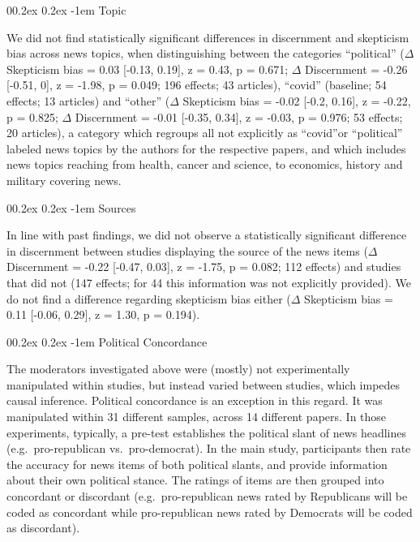 \documentclass[
  man]{apa6}
\makeatletter
\let\oldparagraph\paragraph
\renewcommand{\paragraph}{
    \@ifstar
      \xxxParagraphStar
      \xxxParagraphNoStar
  }
\newcommand{\xxxParagraphStar}[1]{\oldparagraph*{#1}\mbox{}}
\newcommand{\xxxParagraphNoStar}[1]{\oldparagraph{#1}\mbox{}}
\renewcommand{\paragraph}{\@startsection{paragraph}{4}{\parindent}%
  {0\baselineskip \@plus 0.2ex \@minus 0.2ex}%
  {-1em}%
  {\normalfont\normalsize\bfseries\itshape\typesectitle}}
\makeatother
\begin{document}
\paragraph{Topic}\label{topic}

We did not find statistically significant differences in discernment and skepticism bias across news topics, when distinguishing between the categories ``political'' (\(\Delta\) Skepticism bias = 0.03 {[}-0.13, 0.19{]}, z = 0.43, p = 0.671; \(\Delta\) Discernment = -0.26 {[}-0.51, 0{]}, z = -1.98, p = 0.049; 196 effects; 43 articles), ``covid'' (baseline; 54 effects; 13 articles) and ``other'' (\(\Delta\) Skepticism bias = -0.02 {[}-0.2, 0.16{]}, z = -0.22, p = 0.825; \(\Delta\) Discernment = -0.01 {[}-0.35, 0.34{]}, z = -0.03, p = 0.976; 53 effects; 20 articles), a category which regroups all not explicitly as ``covid''or ``political'' labeled news topics by the authors for the respective papers, and which includes news topics reaching from health, cancer and science, to economics, history and military covering news.

\paragraph{Sources}\label{sources}

In line with past findings, we did not observe a statistically significant difference in discernment between studies displaying the source of the news items (\(\Delta\) Discernment = -0.22 {[}-0.47, 0.03{]}, z = -1.75, p = 0.082; 112 effects) and studies that did not (147 effects; for 44 this information was not explicitly provided). We do not find a difference regarding skepticism bias either (\(\Delta\) Skepticism bias = 0.11 {[}-0.06, 0.29{]}, z = 1.30, p = 0.194).

\paragraph{Political Concordance}\label{political-concordance}

The moderators investigated above were (mostly) not experimentally manipulated within studies, but instead varied between studies, which impedes causal inference. Political concordance is an exception in this regard. It was manipulated within 31 different samples, across 14 different papers. In those experiments, typically, a pre-test establishes the political slant of news headlines (e.g.~pro-republican vs.~pro-democrat). In the main study, participants then rate the accuracy for news items of both political slants, and provide information about their own political stance. The ratings of items are then grouped into concordant or discordant (e.g.~pro-republican news rated by Republicans will be coded as concordant while pro-republican news rated by Democrats will be coded as discordant).
\end{document}
